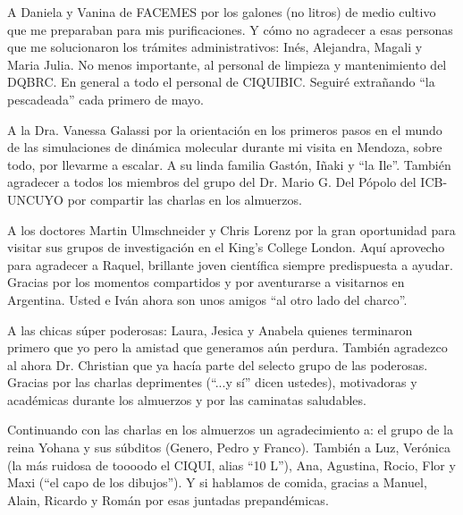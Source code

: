A Daniela y Vanina de FACEMES por los galones (no litros) de medio cultivo que me preparaban para mis purificaciones. Y cómo no agradecer a esas personas que me solucionaron los trámites administrativos: Inés, Alejandra, Magali y Maria Julia. No menos importante, al personal de limpieza y mantenimiento del DQBRC. En general a todo el personal de CIQUIBIC. Seguiré extrañando ``la pescadeada'' cada primero de mayo.\\\vspace{-0.6cm}

A la Dra. Vanessa Galassi por la orientación en los primeros pasos en el mundo de las simulaciones de dinámica molecular durante mi visita en Mendoza, sobre todo, por llevarme a escalar. A su linda familia Gastón, Iñaki y ``la Ile''. También agradecer a todos los miembros del grupo del Dr. Mario G. Del Pópolo del ICB-UNCUYO por compartir las charlas en los almuerzos.\\\vspace{-0.6cm}

A los doctores Martin Ulmschneider y Chris Lorenz por la gran oportunidad para visitar sus grupos de investigación en el King's College London. Aquí aprovecho para agradecer a Raquel, brillante joven científica siempre predispuesta a ayudar. Gracias por los momentos compartidos y por aventurarse a visitarnos en Argentina. Usted e Iván ahora son unos amigos ``al otro lado del charco''.\\\vspace{-0.6cm}

A las chicas súper poderosas: Laura, Jesica y Anabela quienes terminaron primero que yo pero la amistad que generamos aún perdura. También agradezco al ahora Dr. Christian que ya hacía parte del selecto grupo de las poderosas. Gracias por las charlas deprimentes (``...y sí'' dicen ustedes), motivadoras y académicas durante los almuerzos y por las caminatas saludables.\\\vspace{-0.6cm}

Continuando con las charlas en los almuerzos un agradecimiento a: el grupo de la reina  Yohana y sus súbditos (Genero, Pedro y Franco). También a Luz, Verónica (la más ruidosa de toooodo el CIQUI, alias ``10 L''), Ana, Agustina, Rocio, Flor y Maxi (``el capo de los dibujos''). Y si hablamos de comida, gracias a Manuel, Alain, Ricardo y Román por esas juntadas prepandémicas.\\\vspace{-0.6cm}

